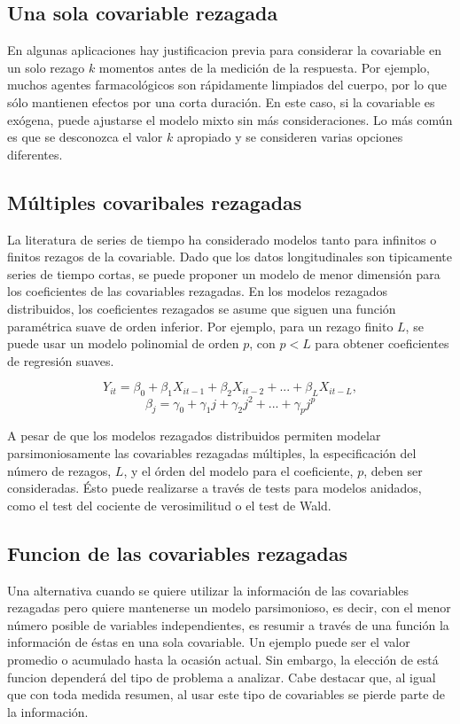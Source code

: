 \documentclass[spanish]{article}
\numberwithin{figure}{subsection}
\numberwithin{equation}{subsection}
\numberwithin{table}{subsection}
\begin{document}
\subsection{Una sola covariable rezagada}

En algunas aplicaciones hay justificacion previa para considerar la covariable
en un solo rezago $k$ momentos antes de la medición de la respuesta. Por
ejemplo, muchos agentes farmacológicos son rápidamente limpiados del cuerpo,
por lo que sólo mantienen efectos por una corta duración. En este caso, si la
covariable es exógena, puede ajustarse el modelo mixto sin más consideraciones.
Lo más común es que se desconozca el valor $k$ apropiado y se consideren varias
opciones diferentes.

\subsection{Múltiples covaribales rezagadas}

La literatura de series de tiempo ha considerado modelos tanto para infinitos o
finitos rezagos de la covariable. Dado que los datos longitudinales son
tipicamente series de tiempo cortas, se puede proponer un modelo de menor
dimensión para los coeficientes de las covariables rezagadas. En los modelos
rezagados distribuidos, los coeficientes rezagados se asume que siguen una
función paramétrica suave de orden inferior. Por ejemplo, para un rezago finito
$L$, se puede usar un modelo polinomial de orden $p$, con $p < L$ para obtener
coeficientes de regresión suaves.

\[ Y_{it} = \beta_0 + \beta_1 X_{it-1} + \beta_2 X_{it-2} + ... +
\beta_L X_{it-L}, \]
\[ \beta_j = \gamma_0 + \gamma_1 j + \gamma_2 j^2 + ... + \gamma_p j^p \]

A pesar de que los modelos rezagados distribuidos permiten modelar
parsimoniosamente las covariables rezagadas múltiples, la especificación del
número de rezagos, $L$, y el órden del modelo para el coeficiente, $p$, deben
ser consideradas. Ésto puede realizarse a través de tests para modelos
anidados, como el test del cociente de verosimilitud o el test de Wald.

\subsection{Funcion de las covariables rezagadas}

Una alternativa cuando se quiere utilizar la información de las covariables
rezagadas pero quiere mantenerse un modelo parsimonioso, es decir, con el menor
número posible de variables independientes, es resumir a través de una función
la información de éstas en una sola covariable. Un ejemplo puede ser el valor
promedio o acumulado hasta la ocasión actual. Sin embargo, la elección de está
funcion dependerá del tipo de problema a analizar. Cabe destacar que, al igual
que con toda medida resumen, al usar este tipo de covariables se pierde
parte de la información.
\end{document}
